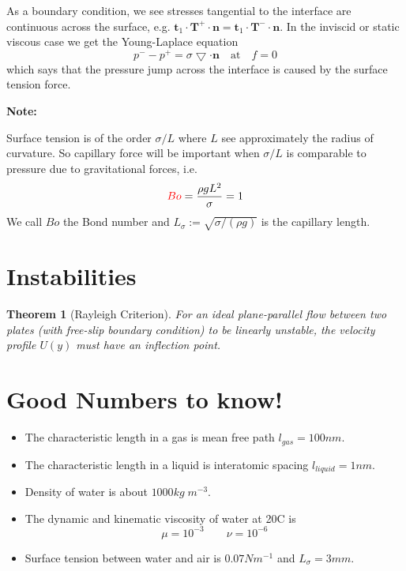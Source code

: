 \documentclass[11pt]{article}
\newcommand{\grad}{\bigtriangledown}
\newcommand{\defeq}{:=}
\newcommand{\mv}[1]{\bm{#1}}
\newcommand{\mdf}[1]{{\color{red}#1}}
\newtheorem{theorem}{Theorem}[section]
\newenvironment{note}
    {\textbf{Note:}\begin{mdframed}[backgroundcolor=white, roundcorner=5pt, linewidth=0pt]}
    {\end{mdframed}}
\begin{document}
As a boundary condition, we see stresses tangential to the interface are continuous across the surface, e.g. $\mv{t}_1\cdot\mv{T}^+ \cdot \mv{n} = \mv{t}_1 \cdot \mv{T}^- \cdot \mv{n}$.
In the inviscid or static viscous case we get the \mdf{Young-Laplace equation}
\[
	p^- - p^+ = \sigma \grad\cdot\mv{n} \quad \text{at} \quad f=0
\]
which says that the pressure jump across the interface is caused by the surface tension force.

\begin{note}
Surface tension is of the order $\sigma / L$ where $L$ see approximately the radius of curvature.
So capillary force will be important when $\sigma / L$ is comparable to pressure due to gravitational forces, i.e.
\[
	\mdf{Bo} = \frac{\rho g L^2}{\sigma}=1
\]
We call $Bo$ the \mdf{Bond number} and $L_\sigma \defeq \sqrt{\sigma/(\rho g)}$ is the \mdf{capillary length}.
\end{note}

\section{Instabilities}
\begin{theorem}[Rayleigh Criterion]
For an ideal plane-parallel flow between two plates (with free-slip boundary condition) to be linearly unstable, the velocity profile $U(y)$ must have an inflection point.
\end{theorem}

\section{Good Numbers to know!}
\begin{itemize}
	\item The characteristic length in a gas is mean free path $l_{gas}=100nm$.
	\item The characteristic length in a liquid is interatomic spacing $l_{liquid} = 1nm$.
	\item Density of water is about $1000kg\;m^{-3}$.
	\item The dynamic and kinematic viscosity of water at 20C is
		\[
			\mu = 10^{-3} \quad\quad \nu = 10^{-6}
		\]
	\item Surface tension between water and air is $0.07Nm^{-1}$ and $L_\sigma = 3mm$.
\end{itemize}
\end{document}
